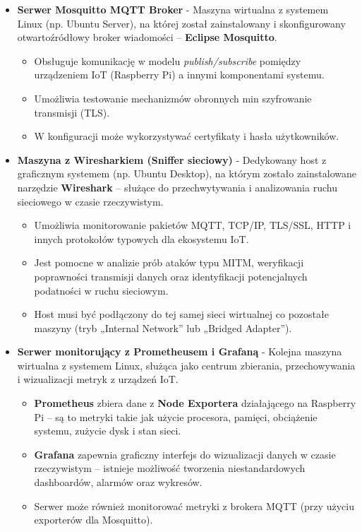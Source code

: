 \begin{itemize}
\item \textbf{Serwer Mosquitto MQTT Broker} -
Maszyna wirtualna z systemem Linux (np. Ubuntu Server), na której został zainstalowany i skonfigurowany otwartoźródłowy broker wiadomości – \textbf{Eclipse Mosquitto}.
\begin{itemize}
\item Obsługuje komunikację w modelu \textit{publish/subscribe} pomiędzy urządzeniem IoT (Raspberry Pi) a innymi komponentami systemu.
\item Umożliwia testowanie mechanizmów obronnych min szyfrowanie transmisji (TLS).
\item W konfiguracji może wykorzystywać certyfikaty i hasła użytkowników.
\end{itemize}
\item \textbf{Maszyna z Wiresharkiem (Sniffer sieciowy)} -
Dedykowany host z graficznym systemem (np. Ubuntu Desktop), na którym zostało zainstalowane narzędzie \textbf{Wireshark} – służące do przechwytywania i analizowania ruchu sieciowego w czasie rzeczywistym.
\begin{itemize}
    \item Umożliwia monitorowanie pakietów MQTT, TCP/IP, TLS/SSL, HTTP i innych protokołów typowych dla ekosystemu IoT.
    \item Jest pomocne w analizie prób ataków typu MITM, weryfikacji poprawności transmisji danych oraz identyfikacji potencjalnych podatności w ruchu sieciowym.
    \item Host musi być podłączony do tej samej sieci wirtualnej co pozostałe maszyny (tryb „Internal Network” lub „Bridged Adapter”).
\end{itemize}

\item \textbf{Serwer monitorujący z Prometheusem i Grafaną} -
Kolejna maszyna wirtualna z systemem Linux, służąca jako centrum zbierania, przechowywania i wizualizacji metryk z urządzeń IoT.
\begin{itemize}
    \item \textbf{Prometheus} zbiera dane z \textbf{Node Exportera} działającego na Raspberry Pi – są to metryki takie jak użycie procesora, pamięci, obciążenie systemu, zużycie dysk i stan sieci.
    \item \textbf{Grafana} zapewnia graficzny interfejs do wizualizacji danych w czasie rzeczywistym – istnieje możliwość tworzenia niestandardowych dashboardów, alarmów oraz wykresów.
    \item Serwer może również monitorować metryki z brokera MQTT (przy użyciu exporterów dla Mosquitto).
\end{itemize}
\end{itemize}

